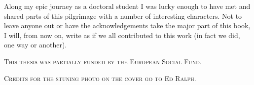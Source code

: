 








\begin{acknowledgements}

Along my epic journey as a doctoral student I was lucky enough to have met and shared parts of this pilgrimage with a number of interesting characters. Not to leave anyone out or have the acknowledgements take the major part of this book, I will, from now on, write as if we all contributed to this work (in fact we did, one way or another).

\end{acknowledgements}

\vfill

\begin{center}
	\textsc{This thesis was partially funded by the European Social Fund.}
	
	\vspace{.2cm}
	
	\textsc{Credits for the stuning photo on the cover go to Ed Ralph.}
\end{center}